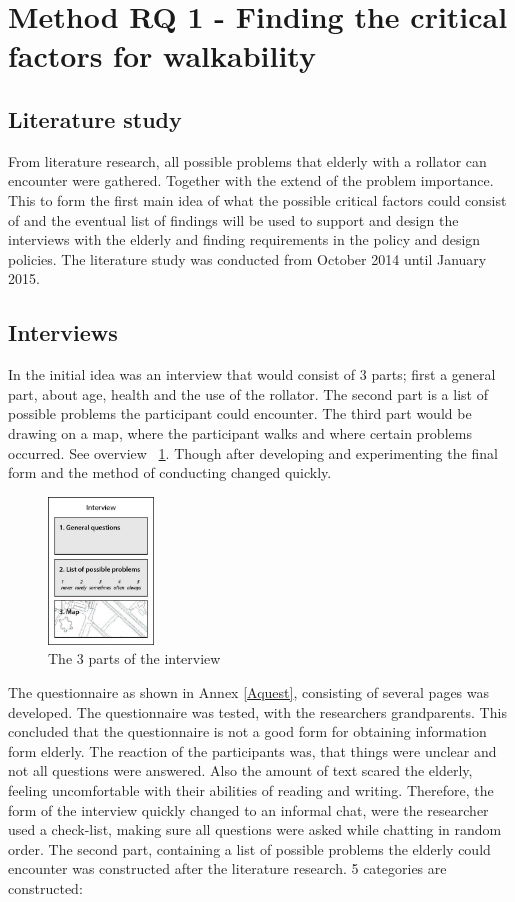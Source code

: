 \section{Method RQ 1 - Finding the critical factors for walkability}
\subsection{Literature study}
From literature research, all possible problems that elderly with a rollator can encounter were gathered. Together with the extend of the problem importance. This to form the first main idea of what the possible critical factors could consist of and the eventual list of findings will be used to support and design the interviews with the elderly and finding requirements in the policy and design policies.
The literature study was conducted from October 2014 until January 2015. 

\subsection{Interviews}
In the initial idea was an interview that would consist of 3 parts; first a general part, about age, health and the use of the rollator. The second part is a list of possible problems the participant could encounter. The third part would be drawing on a map, where the participant walks and where certain problems occurred. See overview ~\ref{interview}. Though after developing and experimenting the final form and the method of conducting changed quickly. 

\begin{figure}[h]
\includegraphics[width=0.25\textwidth]{img/M_interview-01.jpg}
\centering
\caption{The 3 parts of the interview \label{interview}}
\end{figure}

The questionnaire as shown in Annex \ref{Aquest}, consisting of several pages was developed. The questionnaire was tested, with the researchers grandparents. This concluded that the questionnaire is not a good form for obtaining information form elderly. The reaction of the participants was, that things were unclear and not all questions were answered.  Also the amount of text scared the elderly, feeling uncomfortable with their abilities of reading and writing. Therefore, the form of the interview quickly changed to an informal chat, were the researcher used a check-list, making sure all questions were asked while chatting in random order.
\newline
The second part, containing a list of possible problems the elderly could encounter was constructed after the literature research. 5 categories are constructed:

